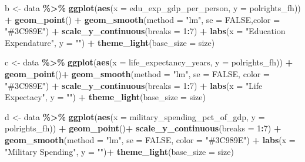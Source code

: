 \documentclass[
  english,
  man,floatsintext]{apa6}
\newenvironment{Shaded}{\begin{snugshade}}{\end{snugshade}}
\newcommand{\DataTypeTok}[1]{\textcolor[rgb]{0.13,0.29,0.53}{#1}}
\newcommand{\DecValTok}[1]{\textcolor[rgb]{0.00,0.00,0.81}{#1}}
\newcommand{\KeywordTok}[1]{\textcolor[rgb]{0.13,0.29,0.53}{\textbf{#1}}}
\newcommand{\NormalTok}[1]{#1}
\newcommand{\OperatorTok}[1]{\textcolor[rgb]{0.81,0.36,0.00}{\textbf{#1}}}
\newcommand{\OtherTok}[1]{\textcolor[rgb]{0.56,0.35,0.01}{#1}}
\newcommand{\StringTok}[1]{\textcolor[rgb]{0.31,0.60,0.02}{#1}}
\begin{document}
\begin{Shaded}
\begin{Highlighting}[]
\NormalTok{b \textless{}{-}}\StringTok{ }\NormalTok{data }\OperatorTok{\%\textgreater{}\%}\StringTok{ }
\StringTok{  }\KeywordTok{ggplot}\NormalTok{(}\KeywordTok{aes}\NormalTok{(}\DataTypeTok{x =}\NormalTok{ edu\_exp\_gdp\_per\_person, }\DataTypeTok{y =}\NormalTok{ polrights\_fh)) }\OperatorTok{+}\StringTok{ }
\StringTok{  }\KeywordTok{geom\_point}\NormalTok{() }\OperatorTok{+}\StringTok{ }
\StringTok{  }\KeywordTok{geom\_smooth}\NormalTok{(}\DataTypeTok{method =} \StringTok{"lm"}\NormalTok{, }\DataTypeTok{se =} \OtherTok{FALSE}\NormalTok{,}\DataTypeTok{color =} \StringTok{"\#3C989E"}\NormalTok{) }\OperatorTok{+}
\StringTok{    }\KeywordTok{scale\_y\_continuous}\NormalTok{(}\DataTypeTok{breaks =} \DecValTok{1}\OperatorTok{:}\DecValTok{7}\NormalTok{) }\OperatorTok{+}\StringTok{ }
\StringTok{  }\KeywordTok{labs}\NormalTok{(}\DataTypeTok{x =} \StringTok{"Education Expendature"}\NormalTok{, }\DataTypeTok{y =} \StringTok{""}\NormalTok{) }\OperatorTok{+}
\StringTok{  }\KeywordTok{theme\_light}\NormalTok{(}\DataTypeTok{base\_size =}\NormalTok{ size)}

\NormalTok{c \textless{}{-}}\StringTok{ }\NormalTok{data }\OperatorTok{\%\textgreater{}\%}\StringTok{ }
\StringTok{  }\KeywordTok{ggplot}\NormalTok{(}\KeywordTok{aes}\NormalTok{(}\DataTypeTok{x =}\NormalTok{ life\_expectancy\_years, }\DataTypeTok{y =}\NormalTok{ polrights\_fh)) }\OperatorTok{+}\StringTok{ }
\StringTok{  }\KeywordTok{geom\_point}\NormalTok{()}\OperatorTok{+}\StringTok{ }
\StringTok{  }\KeywordTok{geom\_smooth}\NormalTok{(}\DataTypeTok{method =} \StringTok{"lm"}\NormalTok{, }\DataTypeTok{se =} \OtherTok{FALSE}\NormalTok{, }\DataTypeTok{color =} \StringTok{"\#3C989E"}\NormalTok{) }\OperatorTok{+}
\StringTok{    }\KeywordTok{scale\_y\_continuous}\NormalTok{(}\DataTypeTok{breaks =} \DecValTok{1}\OperatorTok{:}\DecValTok{7}\NormalTok{) }\OperatorTok{+}\StringTok{ }
\StringTok{  }\KeywordTok{labs}\NormalTok{(}\DataTypeTok{x =} \StringTok{"Life Expectacy"}\NormalTok{, }\DataTypeTok{y =} \StringTok{""}\NormalTok{) }\OperatorTok{+}
\StringTok{  }\KeywordTok{theme\_light}\NormalTok{(}\DataTypeTok{base\_size =}\NormalTok{ size)}

\NormalTok{d \textless{}{-}}\StringTok{ }\NormalTok{data }\OperatorTok{\%\textgreater{}\%}\StringTok{ }
\StringTok{  }\KeywordTok{ggplot}\NormalTok{(}\KeywordTok{aes}\NormalTok{(}\DataTypeTok{x =}\NormalTok{ military\_spending\_pct\_of\_gdp, }\DataTypeTok{y =}\NormalTok{ polrights\_fh)) }\OperatorTok{+}\StringTok{ }
\StringTok{  }\KeywordTok{geom\_point}\NormalTok{()}\OperatorTok{+}\StringTok{ }
\StringTok{  }\KeywordTok{scale\_y\_continuous}\NormalTok{(}\DataTypeTok{breaks =} \DecValTok{1}\OperatorTok{:}\DecValTok{7}\NormalTok{) }\OperatorTok{+}\StringTok{ }
\StringTok{  }\KeywordTok{geom\_smooth}\NormalTok{(}\DataTypeTok{method =} \StringTok{"lm"}\NormalTok{, }\DataTypeTok{se =} \OtherTok{FALSE}\NormalTok{, }\DataTypeTok{color =} \StringTok{"\#3C989E"}\NormalTok{) }\OperatorTok{+}\StringTok{ }
\StringTok{  }\KeywordTok{labs}\NormalTok{(}\DataTypeTok{x =} \StringTok{"Military Spending"}\NormalTok{, }\DataTypeTok{y =} \StringTok{""}\NormalTok{)}\OperatorTok{+}\StringTok{ }\KeywordTok{theme\_light}\NormalTok{(}\DataTypeTok{base\_size =}\NormalTok{ size)}


\end{Highlighting}
\end{Shaded}
\end{document}
